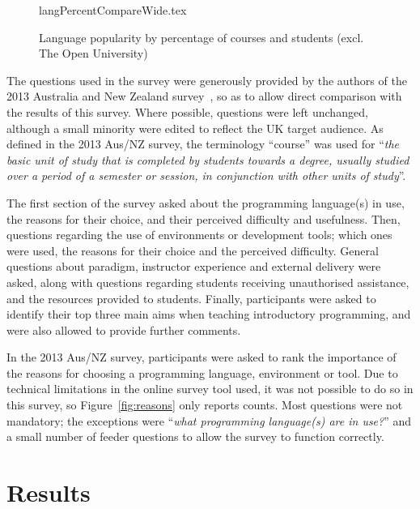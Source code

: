 \documentclass[english,submission]{programming}
\begin{document}
\begin{figure}
\begin{center}
{langPercentCompareWide.tex}
\end{center}
\caption{Language popularity by percentage of courses and students
  (excl. The Open University)\label{fig:lang}}
\end{figure}

The questions used in the survey were generously provided by the
authors of the 2013 Australia and New Zealand
survey~\cite{mason+cooper:2014}, so as to allow direct comparison with
the results of this survey. Where possible, questions were left
unchanged, although a small minority were edited to reflect the UK
target audience. As defined in the 2013 Aus/NZ survey, the terminology
``course'' was used for ``{\emph{the basic unit of study that is
completed by students towards a degree, usually studied over a period
of a semester or session, in conjunction with other units of
study}}''.

The first section of the survey asked about the programming
language(s) in use, the reasons for their choice, and their perceived
difficulty and usefulness. Then, questions regarding the use of
environments or development tools; which ones were used, the reasons
for their choice and the perceived difficulty. General questions about
paradigm, instructor experience and external delivery were asked,
along with questions regarding students receiving unauthorised
assistance, and the resources provided to students. Finally,
participants were asked to identify their top three main aims when
teaching introductory programming, and were also allowed to provide
further comments.

In the 2013 Aus/NZ survey, participants were asked to rank
the importance of the reasons for choosing a programming language,
environment or tool. Due to technical limitations in the online survey
tool used, it was not possible to do so in this survey, so
Figure~\ref{fig:reasons} only reports counts. Most questions were not
mandatory; the exceptions were ``{\emph{what programming language(s)
are in use?}}'' and a small number of feeder questions to allow the
survey to function correctly.


\section{Results}\label{results}
\end{document}
